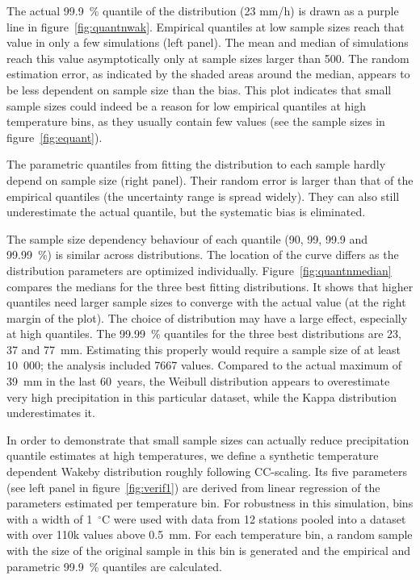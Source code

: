 \documentclass[a4paper]{article}
\begin{document}
\begin{multicols}{2}
The actual 99.9~\% quantile of the distribution (23 mm/h) is drawn as a purple line in figure~\ref{fig:quantnwak}.
Empirical quantiles at low sample sizes reach that value in only a few simulations (left panel). The mean and median of simulations reach this value asymptotically only at sample sizes larger than 500.
The random estimation error, as indicated by the shaded areas around the median, appears to be less dependent on sample size than the bias. 
This plot indicates that small sample sizes could indeed be a reason for low empirical quantiles at high temperature bins, as they usually contain few values (see the sample sizes in figure~\ref{fig:equant}).

The parametric quantiles from fitting the distribution to each sample hardly depend on sample size (right panel).
Their random error is larger than that of the empirical quantiles (the uncertainty range is spread widely).
They can also still underestimate the actual quantile, but the systematic bias is eliminated. 

The sample size dependency behaviour of each quantile (90, 99, 99.9 and 99.99~\%) is similar across distributions.
The location of the curve differs as the distribution parameters are optimized individually.
Figure~\ref{fig:quantnmedian} compares the medians for the three best fitting distributions.
It shows that higher quantiles need larger sample sizes to converge with the actual value (at the right margin of the plot).
The choice of distribution may have a large effect, especially at high quantiles. 
The 99.99~\% quantiles for the three best distributions are 23, 37 and 77~mm.
Estimating this properly would require a sample size of at least 10~000; the analysis included 7667 values.
Compared to the actual maximum of 39~mm in the last 60~years, the Weibull distribution appears to overestimate very high precipitation in this particular dataset, while the Kappa distribution underestimates it.

In order to demonstrate that small sample sizes can actually reduce precipitation quantile estimates at high temperatures, we define a synthetic temperature dependent Wakeby distribution roughly following CC-scaling.
Its five parameters (see left panel in figure~\ref{fig:verif1}) are derived from linear regression of the parameters estimated per temperature bin.
For robustness in this simulation, bins with a width of 1~$^{\circ}$C were used with data from 12 stations pooled into a dataset with over 110k values above 0.5~mm.
For each temperature bin, a random sample with the size of the original sample in this bin is generated and the empirical and parametric 99.9~\% quantiles are calculated.


\end{multicols}
\end{document}
